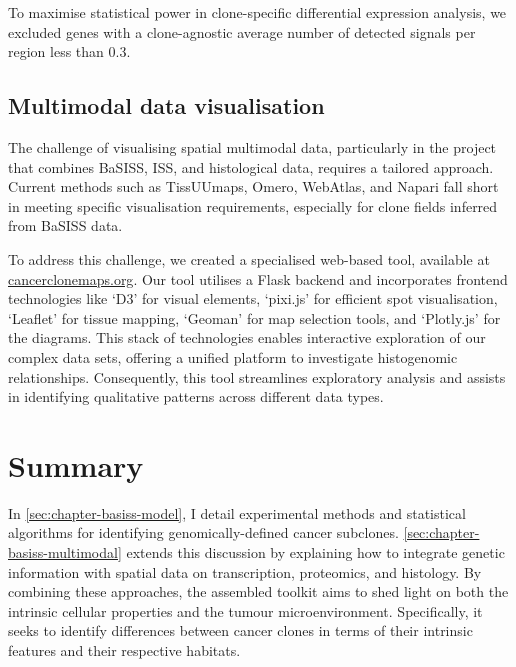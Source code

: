 To maximise statistical power in clone-specific differential expression analysis, we excluded genes with a clone-agnostic average number of detected signals per region less than 0.3.


\subsection{Multimodal data visualisation}
\label{sec:modalities-cancerclonemaps}

The challenge of visualising spatial multimodal data, particularly in the project that combines \ac{BaSISS}, \ac{ISS}, and histological data, requires a tailored approach. Current methods such as \ac{TissUUmaps}, \ac{Omero}, \ac{WebAtlas}, and \ac{Napari} fall short in meeting specific visualisation requirements, especially for clone fields inferred from \ac{BaSISS} data.

To address this challenge, we created a specialised web-based tool, available at \href{https://www.cancerclonemaps.org/}{cancerclonemaps.org}. Our tool utilises a Flask backend and incorporates frontend technologies like `D3' for visual elements, `pixi.js' for efficient spot visualisation, `Leaflet' for tissue mapping, `Geoman' for map selection tools, and `Plotly.js' for the diagrams. This stack of technologies enables interactive exploration of our complex data sets, offering a unified platform to investigate histogenomic relationships. Consequently, this tool streamlines exploratory analysis and assists in identifying qualitative patterns across different data types.

\section{Summary}
\label{sec:modalities-summary}

In \cref{sec:chapter-basiss-model}, I detail experimental methods and statistical algorithms for identifying genomically-defined cancer subclones. \cref{sec:chapter-basiss-multimodal} extends this discussion by explaining how to integrate genetic information with spatial data on transcription, proteomics, and histology. By combining these approaches, the assembled toolkit aims to shed light on both the intrinsic cellular properties and the tumour microenvironment. Specifically, it seeks to identify differences between cancer clones in terms of their intrinsic features and their respective habitats.

